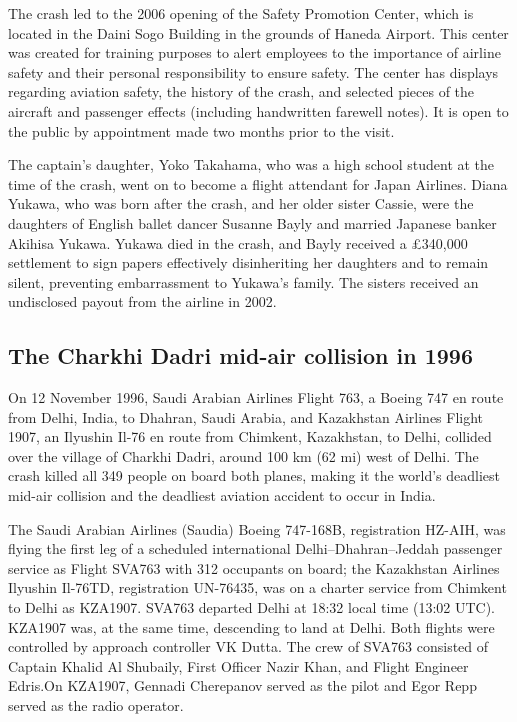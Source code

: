 \documentclass[a4paper,10pt]{article}
\begin{document}
The crash led to the 2006 opening of the Safety Promotion Center, which is located in the Daini Sogo Building in the grounds of Haneda Airport. This center was created for training purposes to alert employees to the importance of airline safety and their personal responsibility to ensure safety. The center has displays regarding aviation safety, the history of the crash, and selected pieces of the aircraft and passenger effects (including handwritten farewell notes). It is open to the public by appointment made two months prior to the visit.\par

The captain's daughter, Yoko Takahama, who was a high school student at the time of the crash, went on to become a flight attendant for Japan Airlines. Diana Yukawa, who was born after the crash, and her older sister Cassie, were the daughters of English ballet dancer Susanne Bayly and married Japanese banker Akihisa Yukawa. Yukawa died in the crash, and Bayly received a £340,000 settlement to sign papers effectively disinheriting her daughters and to remain silent, preventing embarrassment to Yukawa’s family. The sisters received an undisclosed payout from the airline in 2002. 

\subsection{The Charkhi Dadri mid-air collision in 1996}
On 12 November 1996, Saudi Arabian Airlines Flight 763, a Boeing 747 en route from Delhi, India, to Dhahran, Saudi Arabia, and Kazakhstan Airlines Flight 1907, an Ilyushin Il-76 en route from Chimkent, Kazakhstan, to Delhi, collided over the village of Charkhi Dadri, around 100 km (62 mi) west of Delhi. The crash killed all 349 people on board both planes, making it the world's deadliest mid-air collision and the deadliest aviation accident to occur in India.\par

The Saudi Arabian Airlines (Saudia) Boeing 747-168B, registration HZ-AIH, was flying the first leg of a scheduled international Delhi–Dhahran–Jeddah passenger service as Flight SVA763 with 312 occupants on board; the Kazakhstan Airlines Ilyushin Il-76TD, registration UN-76435, was on a charter service from Chimkent to Delhi as KZA1907. SVA763 departed Delhi at 18:32 local time (13:02 UTC). KZA1907 was, at the same time, descending to land at Delhi. Both flights were controlled by approach controller VK Dutta. The crew of SVA763 consisted of Captain Khalid Al Shubaily, First Officer Nazir Khan, and Flight Engineer Edris.On KZA1907, Gennadi Cherepanov served as the pilot and Egor Repp served as the radio operator.\par
\end{document}
